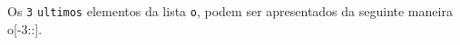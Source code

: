\documentclass[12pt,varwidth=16cm,border=1pt]{standalone}
\begin{document}
Os \verb+3+ \verb+ultimos+ elementos da lista \verb+o+, podem ser apresentados da seguinte maneira o[-3::].

\questiomtrue
\end{document}
